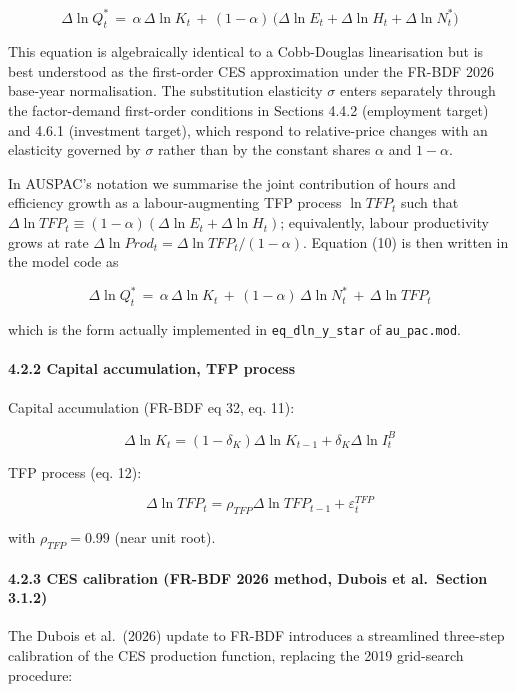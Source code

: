 \documentclass[
]{article}
\begin{document}
\[\Delta \ln Q^*_t \,=\, \alpha\, \Delta \ln K_t \,+\, (1-\alpha)\,\bigl(\Delta \ln E_t + \Delta \ln H_t + \Delta \ln N^*_t\bigr) \tag{10}\]

This equation is algebraically identical to a Cobb-Douglas linearisation
but is best understood as the first-order CES approximation under the
FR-BDF 2026 base-year normalisation. The substitution elasticity
\(\sigma\) enters separately through the factor-demand first-order
conditions in Sections 4.4.2 (employment target) and 4.6.1 (investment
target), which respond to relative-price changes with an elasticity
governed by \(\sigma\) rather than by the constant shares \(\alpha\) and
\(1-\alpha\).

In AUSPAC's notation we summarise the joint contribution of hours and
efficiency growth as a labour-augmenting TFP process \(\ln TFP_t\) such
that
\(\Delta \ln TFP_t \equiv (1-\alpha)(\Delta \ln E_t + \Delta \ln H_t)\);
equivalently, labour productivity grows at rate
\(\Delta \ln Prod_t = \Delta \ln TFP_t / (1-\alpha)\). Equation (10) is
then written in the model code as

\[\Delta \ln Q^*_t \,=\, \alpha\, \Delta \ln K_t \,+\, (1-\alpha)\, \Delta \ln N^*_t \,+\, \Delta \ln TFP_t\]

which is the form actually implemented in \texttt{eq\_dln\_y\_star} of
\texttt{au\_pac.mod}.

\paragraph{4.2.2 Capital accumulation, TFP
process}\label{capital-accumulation-tfp-process}

Capital accumulation (FR-BDF eq 32, eq. 11):

\[\Delta \ln K_t = (1 - \delta_K) \Delta \ln K_{t-1} + \delta_K \Delta \ln I^B_t\]

TFP process (eq. 12):

\[\Delta \ln TFP_t = \rho_{TFP} \Delta \ln TFP_{t-1} + \varepsilon^{TFP}_t\]

with \(\rho_{TFP} = 0.99\) (near unit root).

\paragraph{4.2.3 CES calibration (FR-BDF 2026 method, Dubois et
al.~Section
3.1.2)}\label{ces-calibration-fr-bdf-2026-method-dubois-et-al.-section-3.1.2}

The Dubois et al.~(2026) update to FR-BDF introduces a streamlined
three-step calibration of the CES production function, replacing the
2019 grid-search procedure:
\end{document}
